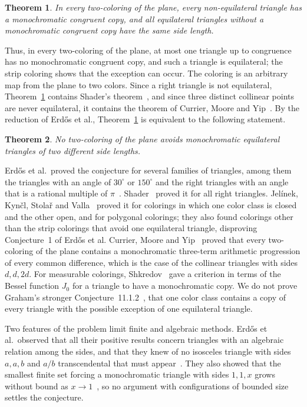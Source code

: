 \documentclass[10pt]{article}
\newtheorem{thm}{Theorem}[section]
\theoremstyle{remark}
\begin{document}
\begin{thm}\label{thm:main}
In every two-coloring of the plane, every non-equilateral triangle has a monochromatic congruent copy, and all equilateral triangles without a monochromatic congruent copy have the same side length.
\end{thm}

Thus, in every two-coloring of the plane, at most one triangle up to congruence has no monochromatic congruent copy, and such a triangle is equilateral; the strip coloring shows that the exception can occur. The coloring is an arbitrary map from the plane to two colors. Since a right triangle is not equilateral, Theorem~\ref{thm:main} contains Shader's theorem~\cite[Theorem~2]{Shader}, and since three distinct collinear points are never equilateral, it contains the theorem of Currier, Moore and Yip~\cite[Theorem~1.1]{CMY}. By the reduction of Erd\H{o}s et al., Theorem~\ref{thm:main} is equivalent to the following statement.

\begin{thm}\label{thm:twoscale}
No two-coloring of the plane avoids monochromatic equilateral triangles of two different side lengths.
\end{thm}

Erd\H{o}s et al.\ proved the conjecture for several families of triangles, among them the triangles with an angle of $30^\circ$ or $150^\circ$ and the right triangles with an angle that is a rational multiple of $\pi$~\cite[Theorems~9 and~17]{EGMRSS}. Shader~\cite[Theorem~2]{Shader} proved it for all right triangles. Jel\'inek, Kyn\v{c}l, Stola\v{r} and Valla~\cite[Theorems~2.1 and~3.20]{JKSV} proved it for colorings in which one color class is closed and the other open, and for polygonal colorings; they also found colorings other than the strip colorings that avoid one equilateral triangle, disproving Conjecture~1 of Erd\H{o}s et al. Currier, Moore and Yip~\cite[Theorem~1.1]{CMY} proved that every two-coloring of the plane contains a monochromatic three-term arithmetic progression of every common difference, which is the case of the collinear triangles with sides $d,d,2d$. For measurable colorings, Shkredov~\cite[Theorem~1]{Shkredov} gave a criterion in terms of the Bessel function $J_0$ for a triangle to have a monochromatic copy. We do not prove Graham's stronger Conjecture~11.1.2~\cite{Graham}, that one color class contains a copy of every triangle with the possible exception of one equilateral triangle.

Two features of the problem limit finite and algebraic methods. Erd\H{o}s et al.\ observed that all their positive results concern triangles with an algebraic relation among the sides, and that they knew of no isosceles triangle with sides $a,a,b$ and $a/b$ transcendental that must appear~\cite[p.~582]{EGMRSS}. They also showed that the smallest finite set forcing a monochromatic triangle with sides $1,1,x$ grows without bound as $x\to1$~\cite[Theorem~28]{EGMRSS}, so no argument with configurations of bounded size settles the conjecture.
\end{document}
